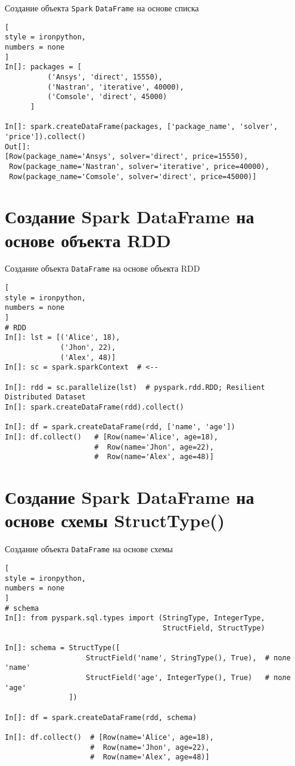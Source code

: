 \documentclass[%
	11pt,
	a4paper,
	utf8,
		]{article}
\begin{document}
Создание объекта \texttt{Spark} \texttt{DataFrame} на основе списка

\begin{lstlisting}[
style = ironpython,
numbers = none
]
In[]: packages = [
          ('Ansys', 'direct', 15550),
          ('Nastran', 'iterative', 40000),
          ('Comsole', 'direct', 45000)
      ]

In[]: spark.createDataFrame(packages, ['package_name', 'solver', 'price']).collect()
Out[]:
[Row(package_name='Ansys', solver='direct', price=15550),
 Row(package_name='Nastran', solver='iterative', price=40000),
 Row(package_name='Comsole', solver='direct', price=45000)]
\end{lstlisting}

\section{Создание Spark DataFrame на основе объекта RDD}

Создание объекта \texttt{DataFrame} на основе объекта RDD

\begin{lstlisting}[
style = ironpython,
numbers = none
]
# RDD
In[]: lst = [('Alice', 18),
             ('Jhon', 22),
             ('Alex', 48)]
In[]: sc = spark.sparkContext  # <--

In[]: rdd = sc.parallelize(lst)  # pyspark.rdd.RDD; Resilient Distributed Dataset
In[]: spark.createDataFrame(rdd).collect()

In[]: df = spark.createDataFrame(rdd, ['name', 'age'])
In[]: df.collect()   # [Row(name='Alice', age=18),
                     #  Row(name='Jhon', age=22),
                     #  Row(name='Alex', age=48)]
\end{lstlisting}

\section{Создание Spark DataFrame на основе схемы StructType()}

Создание объекта \texttt{DataFrame} на основе схемы

\begin{lstlisting}[
style = ironpython,
numbers = none
]
# schema
In[]: from pyspark.sql.types import (StringType, IntegerType,
                                     StructField, StructType)

In[]: schema = StructType([
                   StructField('name', StringType(), True),  # поле 'name'
                   StructField('age', IntegerType(), True)   # поле 'age'
               ])

In[]: df = spark.createDataFrame(rdd, schema)

In[]: df.collect()  # [Row(name='Alice', age=18),
                    #  Row(name='Jhon', age=22),
                    #  Row(name='Alex', age=48)]                               
\end{lstlisting}
\end{document}
